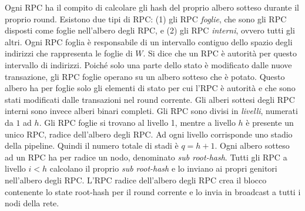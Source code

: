 Ogni RPC ha il compito di calcolare gli hash del proprio albero sotteso durante il proprio round. Esistono due tipi di RPC: (1) gli RPC \emph{foglie}, che sono gli RPC disposti come foglie nell'albero degli RPC, e (2) gli RPC \emph{interni}, ovvero tutti gli altri. Ogni RPC foglia è responsabile di un intervallo contiguo dello spazio degli indirizzi che rappresenta le foglie di $W$. Si dice che un RPC è autorità per questo intervallo di indirizzi. Poiché solo una parte dello stato è modificato dalle nuove transazione, gli RPC foglie operano su un albero sotteso che è potato. Questo albero ha per foglie solo gli elementi di stato per cui l'RPC è autorità e che sono stati modificati dalle transazioni nel round corrente. Gli alberi sottesi degli RPC interni sono invece alberi binari completi. Gli RPC sono divisi in \emph{livelli}, numerati da $1$ ad $h$. Gli RPC foglie si trovano al livello 1, mentre a livello $h$ è presente un unico RPC, radice dell'albero degli RPC. Ad ogni livello corrisponde uno stadio della pipeline. Quindi il numero totale di stadi è $q = h+1$. Ogni albero sotteso ad un RPC ha per radice un nodo, denominato \emph{sub root-hash}. Tutti gli RPC a livello $i < h$ calcolano il proprio \emph{sub root-hash} e lo inviano ai propri genitori nell'albero degli RPC. L'RPC radice dell'albero degli RPC crea il blocco contenente lo state root-hash per il round corrente e lo invia in broadcast a tutti i nodi della rete.

